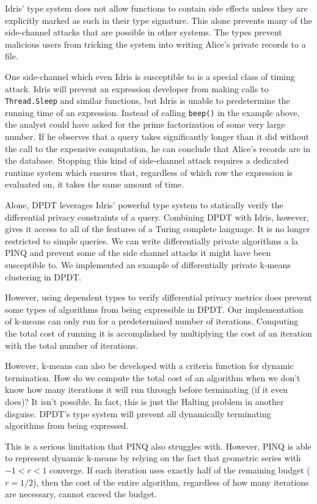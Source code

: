 \documentclass[12pt]{report}
\begin{document}
Idris' type system does not allow functions to contain side effects unless they are explicitly marked as such in their type signature.
This alone prevents many of the side-channel attacks that are possible in other systems.
The types prevent malicious users from tricking the system into writing Alice's private records to a file.

One side-channel which even Idris is susceptible to is a special class of timing attack.
Idris will prevent an expression developer from making calls to \texttt{Thread.Sleep} and similar functions, but Idris is unable to predetermine the running time of an expression.
Instead of calling \texttt{beep()} in the example above, the analyst could have asked for the prime factorization of some very large number.
If he observes that a query takes significantly longer than it did without the call to the expensive computation, he can conclude that Alice's records are in the database.
Stopping this kind of side-channel attack requires a dedicated runtime system which ensures that, regardless of which row the expression is evaluated on, it takes the same amount of time\cite{conf/uss/HaeberlenPN11}.

Alone, DPDT leverages Idris' powerful type system to statically verify the differential privacy constraints of a query.
Combining DPDT with Idris, however, gives it access to all of the features of a Turing complete language.
It is no longer restricted to simple queries.
We can write differentially private algorithms a la PINQ and prevent some of the side channel attacks it might have been susceptible to.
We implemented an example of differentially private k-means clustering in DPDT.

However, using dependent types to verify differential privacy metrics does prevent some types of algorithms from being expressible in DPDT.
Our implementation of k-means can only run for a predetermined number of iterations.
Computing the total cost of running it is accomplished by multiplying the cost of an iteration with the total number of iterations.

However, k-means can also be developed with a criteria function for dynamic termination.
How do we compute the total cost of an algorithm when we don't know how many iterations it will run through before terminating (if it even does)?
It isn't possible.
In fact, this is just the Halting problem in another disguise.
DPDT's type system will prevent all dynamically terminating algorithms from being expressed.

This is a serious limitation that PINQ also struggles with.
However, PINQ is able to represent dynamic k-means by relying on the fact that geometric series with $-1 < r < 1$ converge.
If each iteration uses exactly half of the remaining budget ($r=1/2$), then the cost of the entire algorithm, regardless of how many iterations are necessary, cannot exceed the budget.
\end{document}
